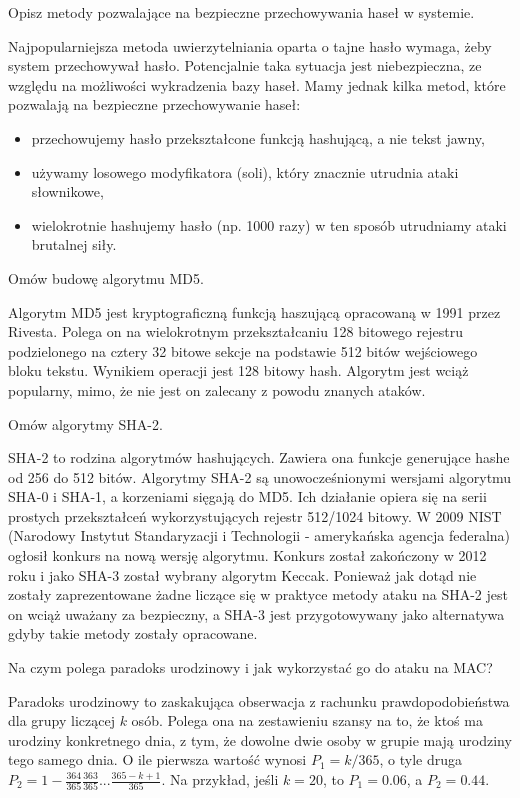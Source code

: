 \documentclass[answers,11pt]{exam}
\begin{document}
\begin{questions}
\question Opisz metody pozwalające na bezpieczne przechowywania haseł w systemie.
\begin{solution}
Najpopularniejsza metoda uwierzytelniania oparta o tajne hasło wymaga, żeby system przechowywał hasło. Potencjalnie taka sytuacja jest niebezpieczna, ze względu na możliwości wykradzenia bazy haseł. Mamy jednak kilka metod, które pozwalają na bezpieczne przechowywanie haseł:
\begin{itemize}
\item przechowujemy hasło przekształcone funkcją hashującą, a nie tekst jawny,
\item używamy losowego modyfikatora (soli), który znacznie utrudnia ataki słownikowe,
\item wielokrotnie hashujemy hasło (np. 1000 razy) w ten sposób utrudniamy ataki brutalnej siły.
\end{itemize}
\end{solution}

\question Omów budowę algorytmu MD5.
\begin{solution}
Algorytm MD5 jest kryptograficzną funkcją haszującą opracowaną w 1991 przez Rivesta. Polega on na wielokrotnym przekształcaniu 128 bitowego rejestru podzielonego na cztery 32 bitowe sekcje na podstawie 512 bitów wejściowego bloku tekstu. Wynikiem operacji jest 128 bitowy hash. Algorytm jest wciąż popularny, mimo, że nie jest on zalecany z powodu znanych ataków.
\end{solution}

\question Omów algorytmy SHA-2.
\begin{solution}
SHA-2 to rodzina algorytmów hashujących. Zawiera ona funkcje generujące hashe od 256 do 512 bitów. Algorytmy SHA-2 są unowocześnionymi wersjami algorytmu SHA-0 i SHA-1, a korzeniami sięgają do MD5. Ich działanie opiera się na serii prostych przekształceń wykorzystujących rejestr 512/1024 bitowy. W 2009 NIST (Narodowy Instytut Standaryzacji i Technologii - amerykańska agencja federalna) ogłosił konkurs na nową wersję algorytmu. Konkurs został zakończony w 2012 roku i jako SHA-3 został wybrany algorytm Keccak. Ponieważ jak dotąd nie zostały zaprezentowane żadne liczące się w praktyce metody ataku na SHA-2 jest on wciąż uważany za bezpieczny, a SHA-3 jest przygotowywany jako alternatywa gdyby takie metody zostały opracowane.
\end{solution}

\question Na czym polega paradoks urodzinowy i jak wykorzystać go do ataku na MAC?
\begin{solution}
Paradoks urodzinowy to zaskakująca obserwacja z rachunku prawdopodobieństwa dla grupy liczącej  $k$ osób. Polega ona na zestawieniu szansy na to, że ktoś ma urodziny konkretnego dnia, z tym, że dowolne dwie osoby w grupie mają urodziny tego samego dnia. O ile pierwsza wartość wynosi $P_1 = k/365$, o tyle druga $P_2 = 1 - \frac{364}{365}\frac{363}{365} ... \frac{365-k+1}{365}$. 
Na przykład, jeśli $k=20$, to $P_1 = 0.06$, a $P_2 = 0.44$. 
\end{solution}


\end{questions}
\end{document}
